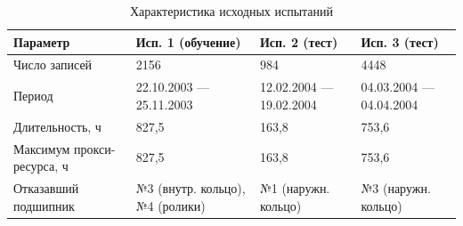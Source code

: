 \begin{table}[H]
\centering
\small
\setlength{\tabcolsep}{4pt}
\caption{Характеристика исходных испытаний}\label{tab:data}
\begin{tabular}{p{2.6cm}p{3.1cm}p{3.1cm}p{3.1cm}}
\toprule
Параметр & Исп. 1 (обучение) & Исп. 2 (тест) & Исп. 3 (тест) \\
\midrule
Число записей & 2156 & 984 & 4448 \\
Период & 22.10.2003 --- 25.11.2003 & 12.02.2004 --- 19.02.2004 & 04.03.2004 --- 04.04.2004 \\
Длительность, ч & 827,5 & 163,8 & 753,6 \\
Максимум прокси-ресурса, ч & 827,5 & 163,8 & 753,6 \\
Отказавший подшипник & №3 (внутр. кольцо), №4 (ролики) & №1 (наружн. кольцо) & №3 (наружн. кольцо) \\
\bottomrule
\end{tabular}
\end{table}